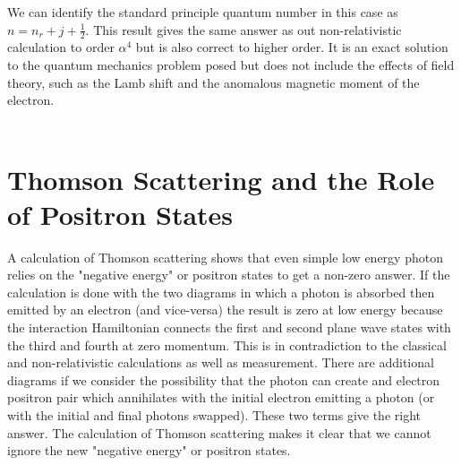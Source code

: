 \documentclass{report}
\begin{document}
We can identify the standard principle quantum number in this case as $\displaystyle n = n_{r} + j + \frac{1}{2}$. This result gives the same answer as out non-relativistic calculation to order $\displaystyle \alpha^{4}$ but is also correct to higher order. It is an exact solution to the quantum mechanics problem posed but does not include the effects of field theory, such as the Lamb shift and the anomalous magnetic moment of the electron.
\\
\\

\section{Thomson Scattering and the Role of Positron States}
A calculation of Thomson scattering shows that even simple low energy photon relies on the "negative energy" or positron states to get a non-zero answer. If the calculation is done with the two diagrams in which a photon is absorbed then emitted by an electron (and vice-versa) the result is zero at low energy because the interaction Hamiltonian connects the first and second plane wave states with the third and fourth at zero momentum. This is in contradiction to the classical and non-relativistic calculations as well as measurement. There are additional diagrams if we consider the possibility that the photon can create and electron positron pair which annihilates with the initial electron emitting a photon (or with the initial and final photons swapped). These two terms give the right answer. The calculation of Thomson scattering makes it clear that we cannot ignore the new "negative energy" or positron states.
\\
\\
\end{document}
